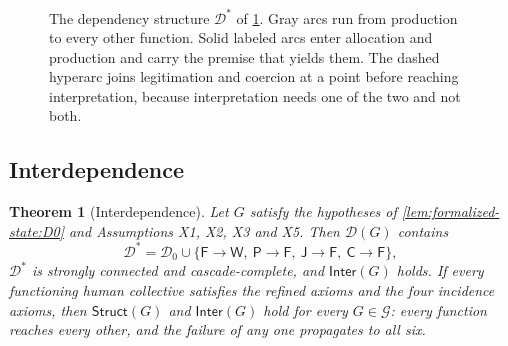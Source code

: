 \documentclass[11pt,letterpaper]{article}
\newtheorem{theorem}{Theorem}[section]
\theoremstyle{definition}
\theoremstyle{remark}
\newcommand{\pF}{\mathsf{F}}
\newcommand{\pP}{\mathsf{P}}
\newcommand{\pJ}{\mathsf{J}}
\newcommand{\pI}{\mathsf{I}}
\newcommand{\pC}{\mathsf{C}}
\newcommand{\pW}{\mathsf{W}}
\newcommand{\Struct}{\mathsf{Struct}}
\newcommand{\Inter}{\mathsf{Inter}}
\newcommand{\Dzero}{\mathcal{D}_0}
\newcommand{\Dstar}{\mathcal{D}^{*}}
\begin{document}
\begin{figure}[t]
\centering
{}
\caption{The dependency structure $\Dstar$ of \cref{thm:formalized-state:interdependence}. Gray arcs run from production to every other function. Solid labeled arcs enter allocation and production and carry the premise that yields them. The dashed hyperarc joins legitimation and coercion at a point before reaching interpretation, because interpretation needs one of the two and not both.}
\label{fig:hypergraph}
\end{figure}

\subsection{Interdependence}

\begin{theorem}[Interdependence]
\label{thm:formalized-state:interdependence}
Let $G$ satisfy the hypotheses of \cref{lem:formalized-state:D0} and Assumptions X1, X2, X3 and X5. Then $\mathcal{D}(G)$ contains
\[
\Dstar=\Dzero\cup\{\pF\to\pW,\ \pP\to\pF,\ \pJ\to\pF,\ \pC\to\pF\},
\]
$\Dstar$ is strongly connected and cascade-complete, and $\Inter(G)$ holds. If every functioning human collective satisfies the refined axioms and the four incidence axioms, then $\Struct(G)$ and $\Inter(G)$ hold for every $G\in\mathcal{G}$: every function reaches every other, and the failure of any one propagates to all six.
\end{theorem}
\end{document}
